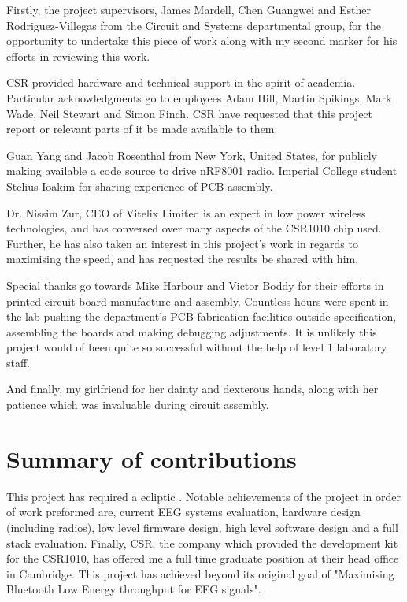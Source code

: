 \documentclass[]{article}
\begin{document}
Firstly, the project supervisors, James Mardell, Chen Guangwei and Esther Rodriguez-Villegas from the Circuit and Systems departmental group, for the opportunity to undertake this piece of work along with my second marker for his efforts in reviewing this work. 

\ac{CSR} provided hardware and technical support in the spirit of academia. Particular acknowledgments go to employees Adam Hill, Martin Spikings, Mark Wade, Neil Stewart and Simon Finch. CSR have requested that this project report or relevant parts of it be made available to them.

Guan Yang and Jacob Rosenthal from New York, United States, for publicly making available a code source to drive nRF8001 radio. Imperial College student Stelius Ioakim for sharing experience of \ac{PCB} assembly. 

Dr. Nissim Zur, CEO of Vitelix Limited is an expert in low power wireless technologies, and has conversed over many aspects of the CSR1010 chip used. Further, he has also taken an interest in this project's work in regards to maximising the speed, and has requested the results be shared with him.

Special thanks go towards Mike Harbour and Victor Boddy for their efforts in printed circuit board manufacture and assembly. Countless hours were spent in the lab pushing the department's PCB fabrication facilities outside specification, assembling the boards and making debugging adjustments. It is unlikely this project would of been quite so successful without the help of level 1 laboratory staff. 

And finally, my girlfriend for her dainty and dexterous hands, along with her patience which was invaluable during circuit assembly. 

\clearpage
\section{Summary of contributions}
This project has required a ecliptic . Notable achievements of the project in order of work preformed are, current \ac{EEG} systems evaluation, hardware design (including radios), low level firmware design, high level software design and a full stack evaluation. Finally, \ac{CSR}, the company which provided the development kit for the CSR1010, has offered me a full time graduate position at their head office in Cambridge.
This project has achieved beyond its original goal of "Maximising Bluetooth Low Energy throughput for \ac{EEG} signals". 
\end{document}

